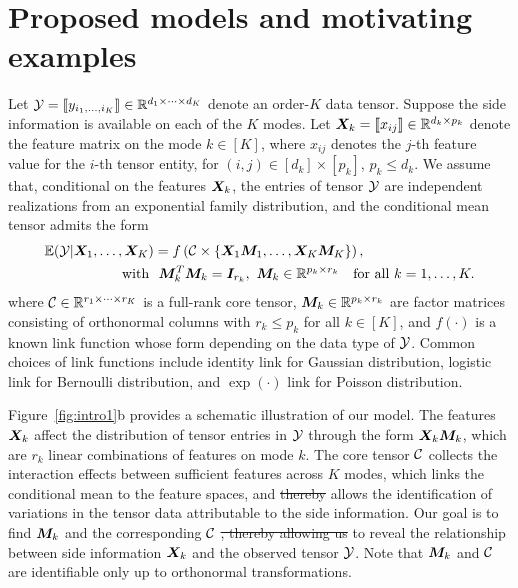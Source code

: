 \documentclass{article}
\theoremstyle{definition}
\theoremstyle{definition}
\providecommand{\DIFaddtex}[1]{{\protect\color{blue}\uwave{#1}}} %
\providecommand{\DIFdeltex}[1]{{\protect\color{red}\sout{#1}}}                      %
\providecommand{\DIFadd}[1]{{\DIFaddtex{#1}}} %
\providecommand{\DIFdel}[1]{{\DIFdeltex{#1}}} %
\begin{document}
\section{Proposed models and motivating examples}
Let $\mathcal{Y}=\llbracket y_{i_1,\ldots,i_K} \rrbracket\in\mathbb{R}^{d_1\times \cdots\times d_K}$ denote an order-$K$ data tensor. Suppose the side information is available on each of the $K$ modes. Let $\bm X_k=\llbracket x_{ij} \rrbracket\in\mathbb{R}^{d_k\times p_k}$ denote the feature matrix on the mode $k\in[K]$, where $x_{ij}$ denotes the $j$-th feature value for the $i$-th tensor entity, for $(i,j)\in[d_k]\times[p_k]$, $p_k\leq d_k$. We assume that, conditional on the features $\bm X_k$, the entries of tensor $\mathcal{Y}$ are independent realizations from an exponential family distribution, and the conditional mean tensor admits the form
\begin{align}\label{eq:decomp}
\mathbb{E}(\tY|\mX_1,\ldots,\mX_K) &= f\left(\tC\times\{\mX_1\mM_1, \ldots, \mX_K\mM_K\}\right),\notag\\
\text{with} \ &\ \mM_k^T\mM_k = \mI_{r_k},\ \mM_k\in\mathbb{R}^{p_k\times r_k}\quad \text{for all }k=1,\ldots,K.
\end{align}
where $\mathcal{C}\in\mathbb{R}^{r_1\times \cdots \times r_K}$ is a full-rank core tensor, $\bm M_k\in\mathbb{R}^{p_k\times r_k}$ are factor matrices consisting of orthonormal columns with $r_k\leq p_k$ for all $k\in[K]$, and $f(\cdot)$ is a known link function whose form depending on the data type of $\mathcal{Y}$. Common choices of link functions include identity link for Gaussian distribution, logistic link for Bernoulli distribution, and $\exp(\cdot)$ link for Poisson distribution. 

Figure~\ref{fig:intro1}b provides a schematic illustration of our model. The features $\bm X_k$ affect the distribution of tensor entries in $\mathcal{Y}$ through the \DIFadd{sufficient features of the} form $\bm X_k\bm M_k$, which are $r_k$ linear combinations of features on mode $k$. The core tensor $\mathcal{C}$ collects the interaction effects between sufficient features across $K$ modes, which links the conditional mean to the feature spaces, and \DIFdel{thereby}\DIFadd{thus} allows the identification of variations in the tensor data attributable to the side information. Our goal is to find $\bm M_k$ and the corresponding $\mathcal{C}$ \DIFdel{, thereby allowing us }to reveal the relationship between side information $\bm X_k$ and the observed tensor $\mathcal{Y}$. Note that $\bm M_k$ and $\mathcal{C}$ are identifiable only up to orthonormal transformations.  
\end{document}
